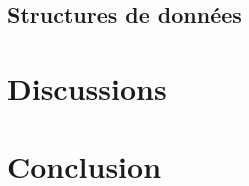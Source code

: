 \documentclass[12pt,french]{article}
\begin{document}

        \subsection{Structures de données} %
        \label{sub:struct-donnes}



    \section{Discussions} %
    \label{sec:discussions}


    \section{Conclusion} %
    \label{sec:Conclusion}


\end{document}
